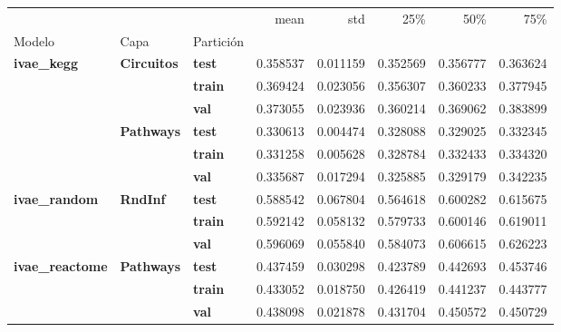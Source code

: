 \begin{tabular}{lllrrrrr}
\toprule
 &  &  & mean & std & 25\% & 50\% & 75\% \\
Modelo & Capa & Partición &  &  &  &  &  \\
\midrule
\multirow[t]{6}{*}{\textbf{ivae\_kegg}} & \multirow[t]{3}{*}{\textbf{Circuitos}} & \textbf{test} & 0.358537 & 0.011159 & 0.352569 & 0.356777 & 0.363624 \\
\textbf{} & \textbf{} & \textbf{train} & 0.369424 & 0.023056 & 0.356307 & 0.360233 & 0.377945 \\
\textbf{} & \textbf{} & \textbf{val} & 0.373055 & 0.023936 & 0.360214 & 0.369062 & 0.383899 \\
\cline{2-8}
\textbf{} & \multirow[t]{3}{*}{\textbf{Pathways}} & \textbf{test} & 0.330613 & 0.004474 & 0.328088 & 0.329025 & 0.332345 \\
\textbf{} & \textbf{} & \textbf{train} & 0.331258 & 0.005628 & 0.328784 & 0.332433 & 0.334320 \\
\textbf{} & \textbf{} & \textbf{val} & 0.335687 & 0.017294 & 0.325885 & 0.329179 & 0.342235 \\
\cline{1-8} \cline{2-8}
\multirow[t]{3}{*}{\textbf{ivae\_random}} & \multirow[t]{3}{*}{\textbf{RndInf}} & \textbf{test} & 0.588542 & 0.067804 & 0.564618 & 0.600282 & 0.615675 \\
\textbf{} & \textbf{} & \textbf{train} & 0.592142 & 0.058132 & 0.579733 & 0.600146 & 0.619011 \\
\textbf{} & \textbf{} & \textbf{val} & 0.596069 & 0.055840 & 0.584073 & 0.606615 & 0.626223 \\
\cline{1-8} \cline{2-8}
\multirow[t]{3}{*}{\textbf{ivae\_reactome}} & \multirow[t]{3}{*}{\textbf{Pathways}} & \textbf{test} & 0.437459 & 0.030298 & 0.423789 & 0.442693 & 0.453746 \\
\textbf{} & \textbf{} & \textbf{train} & 0.433052 & 0.018750 & 0.426419 & 0.441237 & 0.443777 \\
\textbf{} & \textbf{} & \textbf{val} & 0.438098 & 0.021878 & 0.431704 & 0.450572 & 0.450729 \\
\cline{1-8} \cline{2-8}
\bottomrule
\end{tabular}
